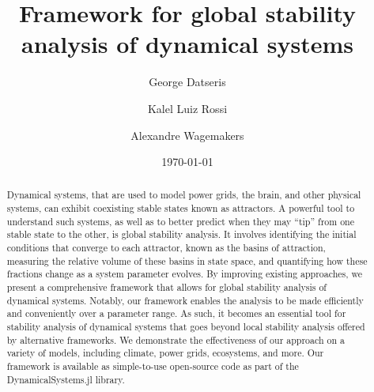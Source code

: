 \documentclass[%
 aip,
 amsmath,amssymb,
 reprint,%
]{revtex4-1}
\begin{document}
 
\title{Framework for global stability analysis of dynamical systems}

\author{George Datseris}
\author{Kalel Luiz Rossi} 
\author{Alexandre Wagemakers}



\date{\today}

\begin{abstract}
Dynamical systems, that are used to model power grids, the brain, and other physical systems, can exhibit coexisting stable states known as attractors. A powerful tool to understand such systems, as well as to better predict when they may ``tip'' from one stable state to the other, is global stability analysis. It involves identifying the initial conditions that converge to each attractor, known as the basins of attraction, measuring the relative volume of these basins in state space, and quantifying how these fractions change as a system parameter evolves. By improving existing approaches, we present a comprehensive framework that allows for global stability analysis of dynamical systems. Notably, our framework enables the analysis to be made efficiently and conveniently over a parameter range. As such, it becomes an essential tool for stability analysis of dynamical systems that goes beyond local stability analysis offered by alternative frameworks. We demonstrate the effectiveness of our approach on a variety of models, including climate, power grids, ecosystems, and more. Our framework is available as simple-to-use open-source code as part of the DynamicalSystems.jl library.
\end{abstract}



\maketitle
\end{document}
